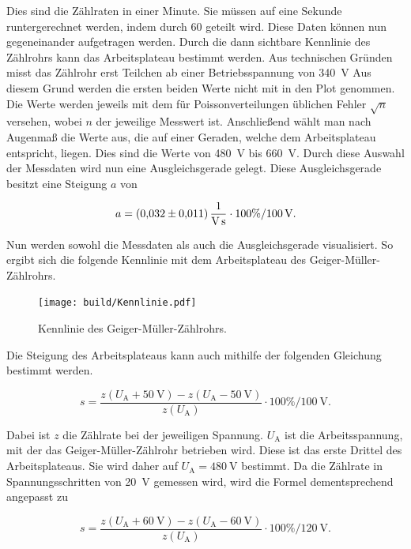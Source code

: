\noindent Dies sind die Zählraten in einer Minute. Sie müssen auf eine Sekunde runtergerechnet werden, indem durch 60 geteilt wird. 
Diese Daten können nun gegeneinander aufgetragen werden. Durch die dann sichtbare Kennlinie 
des Zählrohrs kann das Arbeitsplateau bestimmt werden. 
Aus technischen Gründen misst das Zählrohr erst Teilchen ab einer Betriebsspannung von \qty{340}{\volt} 
Aus diesem Grund werden die ersten beiden Werte nicht mit in den Plot genommen.
Die Werte werden jeweils mit dem für Poissonverteilungen üblichen Fehler $\sqrt{n}$ versehen, wobei $n$ 
der jeweilige Messwert ist.
Anschließend wählt man nach Augenmaß die Werte aus, die auf einer Geraden, welche dem Arbeitsplateau 
entspricht, liegen. Dies sind die Werte von \qty{480}{\volt} bis \qty{660}{\volt}. Durch diese Auswahl 
der Messdaten wird nun eine Ausgleichsgerade gelegt. Diese Ausgleichsgerade besitzt eine Steigung $a$ von

\begin{align*}
    a = \qty{0.032\pm0.011}{\per \volt \per \second} \cdot 100\% / \qty{100}{\volt}. 
\end{align*}

\noindent Nun werden sowohl die Messdaten als auch die Ausgleichsgerade visualisiert.
So ergibt sich die folgende Kennlinie mit dem Arbeitsplateau des Geiger-Müller-Zählrohrs.

\begin{figure}[H]
    \centering
    \texttt{[image: build/Kennlinie.pdf]}
    \caption{Kennlinie des Geiger-Müller-Zählrohrs.}
\end{figure}

\noindent Die Steigung des Arbeitsplateaus kann auch mithilfe der folgenden Gleichung bestimmt werden.

\begin{equation*}
    s = \frac{z(U_\text{A} + \qty{50}{\volt}) - z(U_\text{A} - \qty{50}{\volt}) } { z(U_\text{A}) } \cdot 100\% / \qty{100}{\volt}.
\end{equation*}

\noindent Dabei ist $z$ die Zählrate bei der jeweiligen Spannung. $U_\text{A}$ ist die Arbeitsspannung, mit der 
das Geiger-Müller-Zählrohr betrieben wird. Diese ist das erste Drittel des Arbeitsplateaus. Sie wird daher 
auf $U_\text{A} = \qty{480}{\volt}$ bestimmt. Da die Zählrate in Spannungsschritten von \qty{20}{\volt} gemessen 
wird, wird die Formel dementsprechend angepasst zu  

\begin{equation*}
    s = \frac{z(U_\text{A} + \qty{60}{\volt}) - z(U_\text{A} - \qty{60}{\volt}) } { z(U_\text{A}) } \cdot 100\% / \qty{120}{\volt}.
\end{equation*}

